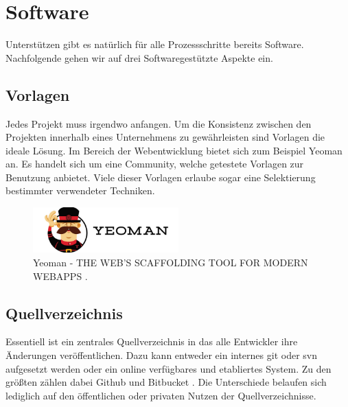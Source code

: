 \chapter{Software}
Unterstützen gibt es natürlich für alle Prozessschritte bereits Software. Nachfolgende gehen wir auf drei Softwaregestützte Aspekte ein.

\section{Vorlagen}
Jedes Projekt muss irgendwo anfangen. Um die Konsistenz zwischen den Projekten innerhalb eines Unternehmens zu gewährleisten sind Vorlagen die ideale Lösung. Im Bereich der Webentwicklung bietet sich zum Beispiel Yeoman \cite{yeoman} an. Es handelt sich um eine Community, welche getestete Vorlagen zur Benutzung anbietet. Viele dieser Vorlagen erlaube sogar eine Selektierung bestimmter verwendeter Techniken.

\begin{figure}[!htb]
	\centerline{\includegraphics[width=0.5\textwidth]{img/yeoman}}
	\caption{Yeoman - THE WEB'S SCAFFOLDING TOOL FOR MODERN WEBAPPS \cite{yeoman}.}
	\label{yeoman}
\end{figure}

\section{Quellverzeichnis}
Essentiell ist ein zentrales Quellverzeichnis in das alle Entwickler ihre Änderungen veröffentlichen. Dazu kann entweder ein internes git oder svn aufgesetzt werden oder ein online verfügbares und etabliertes System. Zu den größten zählen dabei Github \cite{github} und Bitbucket \cite{bitbucket}. Die Unterschiede belaufen sich lediglich auf den öffentlichen oder privaten Nutzen der Quellverzeichnisse.

